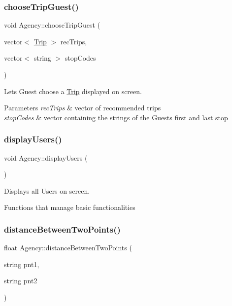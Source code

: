 \subsubsection{\texorpdfstring{choose\+Trip\+Guest()}{chooseTripGuest()}}
{\footnotesize\ttfamily void Agency\+::choose\+Trip\+Guest (\begin{DoxyParamCaption}\item[{vector$<$ \hyperlink{class_trip}{Trip} $>$}]{rec\+Trips,  }\item[{vector$<$ string $>$}]{stop\+Codes }\end{DoxyParamCaption})}



Lets Guest choose a \hyperlink{class_trip}{Trip} displayed on screen. 


\begin{DoxyParams}{Parameters}
{\em rec\+Trips} & vector of recommended trips \\
\hline
{\em stop\+Codes} & vector containing the strings of the Guest\textquotesingle{}s first and last stop \\
\hline
\end{DoxyParams}
\mbox{\label{group___agency_ga485882deafb4fc8d075c9cb096ebd35c}} 
\subsubsection{\texorpdfstring{display\+Users()}{displayUsers()}}
{\footnotesize\ttfamily void Agency\+::display\+Users (\begin{DoxyParamCaption}{ }\end{DoxyParamCaption})}



Displays all Users on screen. 

Functions that manage basic functionalities \mbox{\label{group___agency_ga4efd6041c1293f0366b76356c05e3520}} 
\subsubsection{\texorpdfstring{distance\+Between\+Two\+Points()}{distanceBetweenTwoPoints()}}
{\footnotesize\ttfamily float Agency\+::distance\+Between\+Two\+Points (\begin{DoxyParamCaption}\item[{string}]{pnt1,  }\item[{string}]{pnt2 }\end{DoxyParamCaption})}



